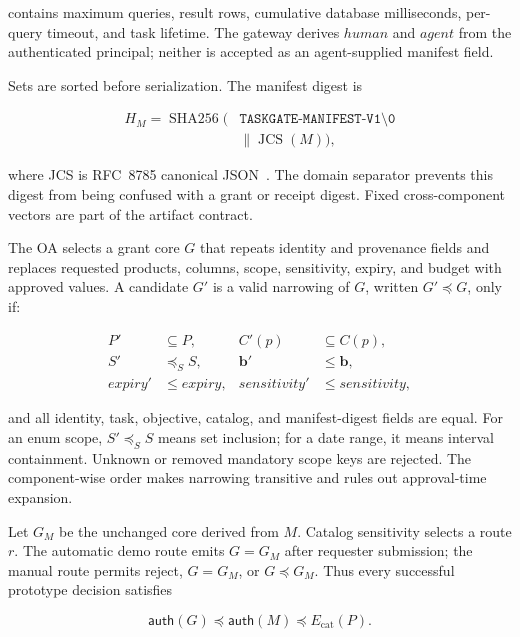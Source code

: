 \documentclass[10pt,journal,compsoc]{IEEEtran}
\newcommand{\vect}[1]{\boldsymbol{#1}}
\begin{document}
contains maximum queries, result rows, cumulative database milliseconds,
per-query timeout, and task lifetime.  The gateway derives $human$ and $agent$
from the authenticated principal; neither is accepted as an agent-supplied
manifest field.

Sets are sorted before serialization.  The manifest digest is

\begin{equation}
\begin{aligned}
 H_M=\operatorname{SHA256}(&\texttt{TASKGATE-MANIFEST-V1\textbackslash0}\\
       &\parallel \operatorname{JCS}(M)),
\end{aligned}
 \label{eq:manifest-digest}
\end{equation}

where JCS is RFC~8785 canonical JSON~\cite{rfc8785}.  The domain separator
prevents this digest from being confused with a grant or receipt digest.  Fixed
cross-component vectors are part of the artifact contract.

The OA selects a grant core $G$ that repeats identity and provenance fields and
replaces requested products, columns, scope, sensitivity, expiry, and budget
with approved values.  A candidate $G'$ is a valid narrowing of $G$, written
$G'\preceq G$, only if:

\begin{align}
 P'&\subseteq P, & C'(p)&\subseteq C(p),\\
 S'&\preceq_S S, & \vect{b}'&\leq\vect{b},\\
 expiry'&\leq expiry, & sensitivity'&\leq sensitivity,
 \label{eq:narrowing}
\end{align}

and all identity, task, objective, catalog, and manifest-digest fields are
equal.  For an enum scope, $S'\preceq_S S$ means set inclusion; for a date
range, it means interval containment.  Unknown or removed mandatory scope keys
are rejected.  The component-wise order makes narrowing transitive and rules
out approval-time expansion.

Let $G_M$ be the unchanged core derived from $M$.  Catalog sensitivity selects a
route $r$.  The automatic demo route emits $G=G_M$ after requester submission;
the manual route permits reject, $G=G_M$, or $G\preceq G_M$.  Thus every
successful prototype decision satisfies

\begin{equation}
  \mathsf{auth}(G)\preceq\mathsf{auth}(M)\preceq E_{\mathrm{cat}}(P).
  \label{eq:approval-chain}
\end{equation}
\end{document}

